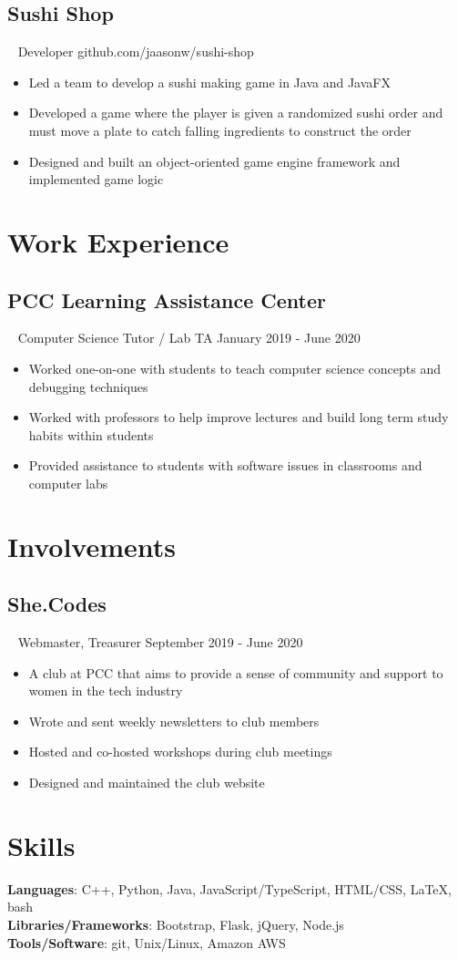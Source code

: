 \documentclass{article}
\newcommand{\resumesection}[3]{
    \subsection*{#1}
    \ 
    \footnotesize
    \textcolor{csufgrey}{#2}
    \footnotesize
    \hfill
    \textcolor{csufgrey}{#3}
    \normalsize
}
\begin{document}
\resumesection{Sushi Shop}{Developer}{github.com/jaasonw/sushi-shop}
\begin{itemize}
    \item Led a team to develop a sushi making game in Java and JavaFX
    \item Developed a game where the player is given a randomized sushi order and must move a plate to catch falling ingredients to construct the order
    \item Designed and built an object-oriented game engine framework and implemented game logic
\end{itemize}
\hfill
\section*{Work Experience}
\resumesection{PCC Learning Assistance Center}{Computer Science Tutor / Lab TA}{January 2019 - June 2020}
\begin{itemize}
    \item Worked one-on-one with students to teach computer science concepts and debugging techniques
    \item Worked with professors to help improve lectures and build long term study habits within students
    \item Provided assistance to students with software issues in classrooms and computer labs
\end{itemize}
\hfill
\section*{Involvements}
\resumesection{She.Codes}{Webmaster, Treasurer}{September 2019 - June 2020}
\begin{itemize}
    \item A club at PCC that aims to provide a sense of community and support to women in the tech industry
    \item Wrote and sent weekly newsletters to club members
    \item Hosted and co-hosted workshops during club meetings
    \item Designed and maintained the club website
\end{itemize}
\hfill
\section*{Skills}
\textbf{Languages}: C++, Python, Java, JavaScript/TypeScript, HTML/CSS, {\selectfont\LaTeX}, bash\\
\textbf{Libraries/Frameworks}: Bootstrap, Flask, jQuery, Node.js\\
\textbf{Tools/Software}: git, Unix/Linux, Amazon AWS
\end{document}
